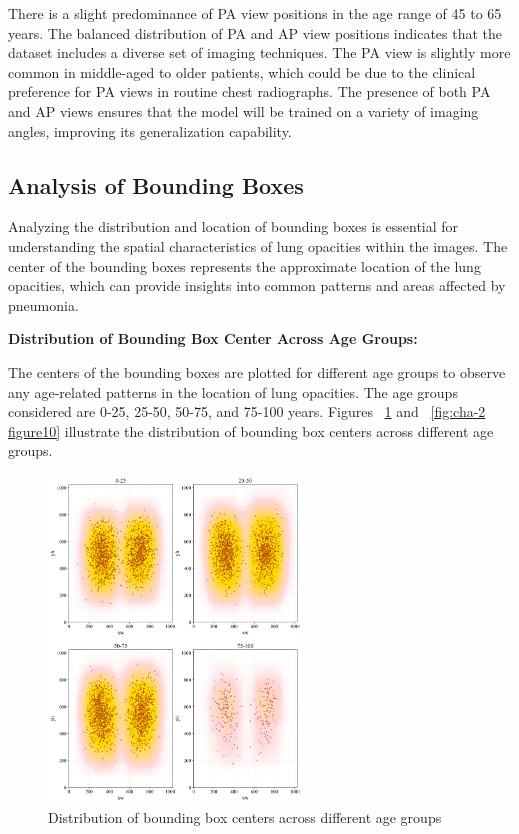 There is a slight predominance of PA view positions in the age range of 45 to 65 years. The balanced distribution of PA and AP view positions indicates that the dataset includes a diverse set of imaging techniques. The PA view is slightly more common in middle-aged to older patients, which could be due to the clinical preference for PA views in routine chest radiographs. The presence of both PA and AP views ensures that the model will be trained on a variety of imaging angles, improving its generalization capability.

\subsection{Analysis of Bounding Boxes}
\label{subsec:chap2 section 1.4}

Analyzing the distribution and location of bounding boxes is essential for understanding the spatial characteristics of lung opacities within the images. The center of the bounding boxes represents the approximate location of the lung opacities, which can provide insights into common patterns and areas affected by pneumonia.

\textbf{Distribution of Bounding Box Center Across Age Groups:}

The centers of the bounding boxes are plotted for different age groups to observe any age-related patterns in the location of lung opacities. The age groups considered are 0-25, 25-50, 50-75, and 75-100 years. Figures ~\ref{fig:cha-2 figure9} and ~\ref{fig:cha-2 figure10} illustrate the distribution of bounding box centers across different age groups.

\begin{figure}[H]
    \begin{center}
        \includegraphics[width = 0.6\textwidth]{figures/Figure14.png}
        \caption{Distribution of bounding box centers across different age groups}
        \label{fig:cha-2 figure9}
    \end{center}
\end{figure}

